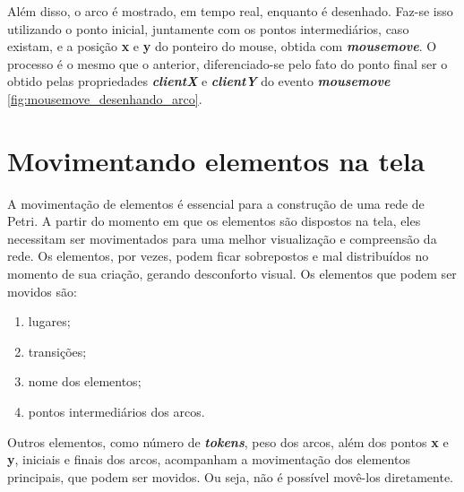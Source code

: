 \documentclass[
	12pt,				%
	openright,			%
	oneside,			%
	a4paper,			%
	english,			%
	brazil				%
	]{abntex2}
\begin{document}
Além disso, o arco é mostrado, em tempo real, enquanto é desenhado. Faz-se isso utilizando o ponto inicial, juntamente com os pontos intermediários, caso existam, e a posição \textbf{x} e \textbf{y} do ponteiro do mouse, obtida com \textbf{\textit{mousemove}}. O processo é o mesmo que o anterior, diferenciado-se pelo fato do ponto final ser o obtido pelas propriedades \textbf{\textit{clientX}} e \textbf{\textit{clientY}} do evento \textbf{\textit{mousemove}} \ref{fig:mousemove_desenhando_arco}. 

\section{Movimentando elementos na tela}\label{cap:move_elements}

A movimentação de elementos é essencial para a construção de uma rede de Petri. A partir do momento em que os elementos são dispostos na tela, eles necessitam ser movimentados para uma melhor visualização e compreensão da rede. Os elementos, por vezes, podem ficar sobrepostos e mal distribuídos no momento de sua criação, gerando desconforto visual. Os elementos que podem ser movidos são: 

\begin{enumerate}
	\item lugares;
	\item transições;
	\item nome dos elementos;
	\item pontos intermediários dos arcos.
\end{enumerate}

Outros elementos, como número de \textbf{\textit{tokens}}, peso dos arcos, além dos pontos \textbf{x} e \textbf{y}, iniciais e finais dos arcos, acompanham a movimentação dos elementos principais, que podem ser movidos. Ou seja, não é possível movê-los diretamente.
\end{document}
